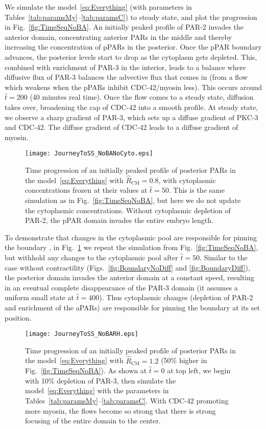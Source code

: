 \documentclass[11pt]{article}
\newcommand{\6}[1]{#1_{\text{6}}}
\newcommand{\3}[1]{#1_{\text{3}}}
\begin{document}
We simulate the model\ \eqref{eq:Everything} (with parameters in Tables\ \ref{tab:paramsMy}--\ref{tab:paramsC}) to steady state, and plot the progression in Fig.\ \ref{fig:TimeSeqNoBA}. An initially peaked profile of PAR-2 invades the anterior domain, concentrating anterior PARs in the middle and thereby increasing the concentration of pPARs in the posterior. Once the pPAR boundary advances, the posterior levels start to drop as the cytoplasm gets depleted. This, combined with enrichment of PAR-3 in the interior, leads to a balance where diffusive flux of PAR-3 balances the advective flux that comes in (from a flow which weakens when the pPARs inhibit CDC-42/myosin less). This occurs around $\hat t = 200$ (40 minutes real time). Once the flow comes to a steady state, diffusion takes over, broadening the cap of CDC-42 into a smooth profile. At steady state, we observe a sharp gradient of PAR-3, which sets up a diffuse gradient of PKC-3 and CDC-42. The diffuse gradient of CDC-42 leads to a diffuse gradient of myosin.

\begin{figure}
\centering
\texttt{[image: JourneyToSS\_NoBANoCyto.eps]}
\caption{\label{fig:TimeSeqNoCyto} Time progression of an initially peaked profile of posterior PARs in the model\ \eqref{eq:Everything} with $\hat R_\text{CM}=0.8$, with cytoplasmic concentrations frozen at their values at $\hat t=50$. This is the same simulation as in Fig.\ \ref{fig:TimeSeqNoBA}, but here we do not update the cytoplasmic concentrations. Without cytoplasmic depletion of PAR-2, the pPAR domain invades the entire embryo length.}
\end{figure}

To demonstrate that changes in the cytoplasmic pool are responsible for pinning the boundary \cite{goehring2011polarization}, in Fig.\ \ref{fig:TimeSeqNoCyto} we repeat the simulation from Fig.\ \ref{fig:TimeSeqNoBA}, but withhold any changes to the cytoplasmic pool after $\hat t = 50$. Similar to the case without contractility (Figs.\ \ref{fig:BoundaryNoDiff} and \ref{fig:BoundaryDiff}), the posterior domain invades the anterior domain at a constant speed, resulting in an eventual complete disappearance of the PAR-3 domain (it assumes a uniform small state at $\hat t = 400$). Thus cytoplasmic changes (depletion of PAR-2 and enrichment of the aPARs) are responsible for pinning the boundary at its set position.

\begin{figure}
\centering
\texttt{[image: JourneyToSS\_NoBARH.eps]}
\caption{\label{fig:TimeSeqNoBARH} Time progression of an initially peaked profile of posterior PARs in the model\ \eqref{eq:Everything} with $\hat R_\text{CM}=1.2$ (50\% higher in Fig.\ \ref{fig:TimeSeqNoBA}). As shown at $\hat t=0$ at top left, we begin with 10\% depletion of PAR-3, then simulate the model\ \eqref{eq:Everything} with the parameters in Tables\ \ref{tab:paramsMy}--\ref{tab:paramsC}. With CDC-42 promoting more myosin, the flows become so strong that there is strong focusing of the entire domain to the center.}
\end{figure}
\end{document}
